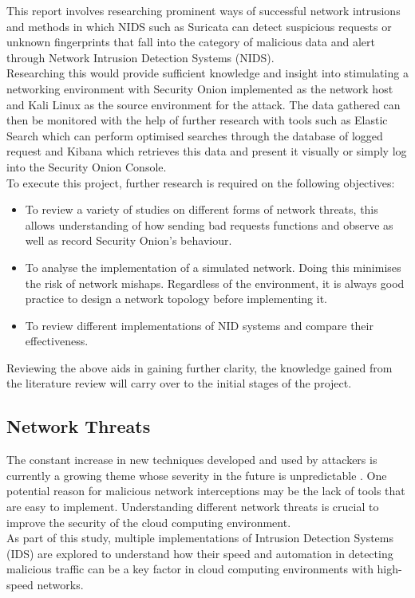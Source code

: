 \documentclass[12pt]{article}
\begin{document}
	
	This report involves researching prominent ways of successful network intrusions and
	methods in which NIDS such as Suricata can detect suspicious requests or unknown fingerprints that fall into the category of malicious data and alert through Network Intrusion Detection
	Systems (NIDS). 
	\\
	Researching this would provide sufficient knowledge and insight into stimulating a networking environment with Security Onion implemented as the network host and Kali Linux as the source environment for the attack. 
	The data gathered can then be monitored with the help of further research with tools such
	as Elastic Search which can perform optimised searches through the database of logged
	request and Kibana which retrieves this data and present it visually or simply log into the Security Onion Console.\\
	To execute this project, further research is required on the following objectives:
	
	\begin{itemize}
		\item To review a variety of studies on different forms of network threats, this allows understanding of how sending bad requests functions and observe as well as record Security Onion's behaviour. 
		\item  To analyse the implementation of a simulated network. Doing this minimises the risk of network mishaps. Regardless of the environment, it is always good practice to design a network topology before implementing it.
		\item To review different implementations of NID systems and compare their effectiveness.%
	\end{itemize}
	Reviewing the above aids in gaining further clarity, the knowledge gained from the literature review will carry over to the initial stages of the project.
	\subsection{Network Threats} \label{3.1}
	The constant increase in new techniques developed and used by attackers is currently
	a growing theme whose severity in the future is unpredictable \cite{cashell_2001_infosec}. One potential reason for malicious network interceptions may be the lack of tools that are easy to implement.
	Understanding different network threats is crucial to improve the security of the cloud computing environment. 
	\\
	As part of this study, multiple implementations of Intrusion Detection Systems (IDS) are explored to understand how their speed and automation in detecting malicious traffic can be a key factor in cloud computing environments with high-speed networks.
	
\end{document}
